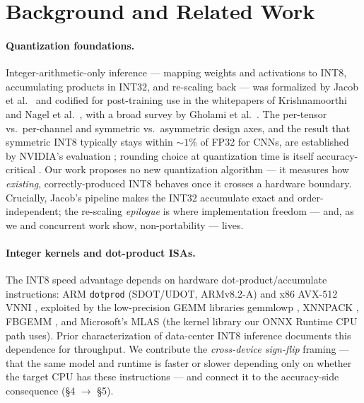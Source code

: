 \documentclass[11pt]{article}
\begin{document}
\section{Background and Related Work}

\paragraph{Quantization foundations.}
Integer-arithmetic-only inference --- mapping weights and activations to INT8, accumulating products in INT32, and re-scaling back --- was formalized by Jacob et al.\ \citep{jacob2018} and codified for post-training use in the whitepapers of Krishnamoorthi \citep{krishnamoorthi2018} and Nagel et al.\ \citep{nagel2021whitepaper}, with a broad survey by Gholami et al.\ \citep{gholami2021survey}. The per-tensor vs.\ per-channel and symmetric vs.\ asymmetric design axes, and the result that symmetric INT8 typically stays within ${\sim}1$\% of FP32 for CNNs, are established by NVIDIA's evaluation \citep{wu2020}; rounding choice at quantization time is itself accuracy-critical \citep{nagel2020adaround}. Our work proposes no new quantization algorithm --- it measures how \emph{existing}, correctly-produced INT8 behaves once it crosses a hardware boundary. Crucially, Jacob's pipeline makes the INT32 accumulate exact and order-independent; the re-scaling \emph{epilogue} is where implementation freedom --- and, as we and concurrent work show, non-portability --- lives.

\paragraph{Integer kernels and dot-product ISAs.}
The INT8 speed advantage depends on hardware dot-product/accumulate instructions: ARM \texttt{dotprod} (SDOT/UDOT, ARMv8.2-A) \citep{armisa} and x86 AVX-512 VNNI \citep{intelisa}, exploited by the low-precision GEMM libraries gemmlowp \citep{gemmlowp}, XNNPACK \citep{xnnpack}, FBGEMM \citep{khudia2021fbgemm}, and Microsoft's MLAS \citep{mlas} (the kernel library our ONNX Runtime CPU path uses). Prior characterization of data-center INT8 inference \citep{park2018facebook} documents this dependence for throughput. We contribute the \emph{cross-device sign-flip} framing --- that the same model and runtime is faster or slower depending only on whether the target CPU has these instructions --- and connect it to the accuracy-side consequence (\S4 $\rightarrow$ \S5).
\end{document}
